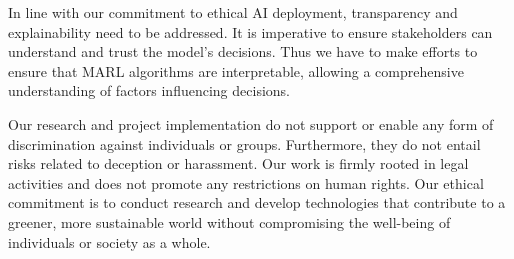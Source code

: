 \documentclass[conference]{IEEEtran}
\begin{document}
	In line with our commitment to ethical AI deployment, transparency and explainability need to be
	addressed. It is imperative to ensure stakeholders can understand and trust the model's decisions.
	Thus we have to make efforts to ensure that MARL algorithms are interpretable, allowing a comprehensive
	understanding of factors influencing decisions.

	Our research and project implementation do not support or enable any form of discrimination against
	individuals or groups. Furthermore, they do not entail risks related to deception or harassment.
	Our work is firmly rooted in legal activities and does not promote any restrictions on human rights.
	Our ethical commitment is to conduct research and develop technologies that contribute to a greener,
	more sustainable world without compromising the well-being of individuals or society as a whole.

	\newpage


	
	
\end{document}
